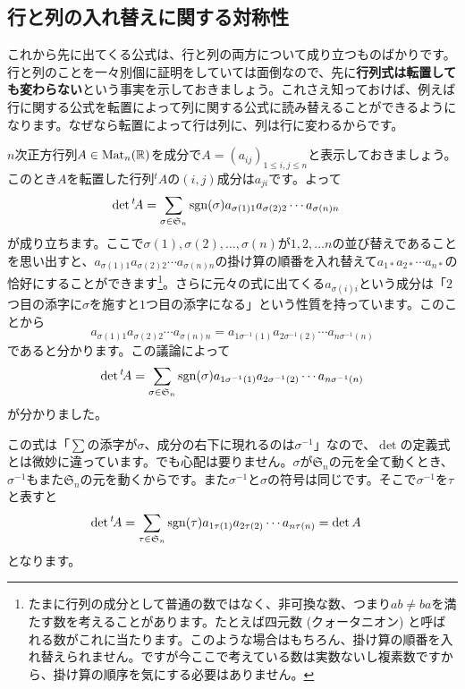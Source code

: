 \subsection{行と列の入れ替えに関する対称性}

これから先に出てくる公式は、行と列の両方について成り立つものばかりです。行と列のことを一々別個に証明をしていては面倒なので、先に\textbf{行列式は転置しても変わらない}という事実を示しておきましょう。これさえ知っておけば、例えば行に関する公式を転置によって列に関する公式に読み替えることができるようになります。なぜなら転置によって行は列に、列は行に変わるからです。

$n$次正方行列$A \in \operatorname{Mat}_n(\mathbb{R})$を成分で$A = (a_{ij})_{1 \leq i, j \leq n}$と表示しておきましょう。このとき$A$を転置した行列${}^t\!A$の$(i, j)$成分は$a_{ji}$です。よって
\begin{align*}
\det {}^t\!A
&= \sum_{\sigma \in \mathfrak{S}_n} \operatorname{sgn}(\sigma) a_{\sigma(1)1} a_{\sigma(2)2} \cdots a_{\sigma(n)n}
\end{align*}
が成り立ちます。ここで$\sigma(1), \sigma(2), \ldots, \sigma(n)$が$1, 2, \ldots n$の並び替えであることを思い出すと、$a_{\sigma(1)1} a_{\sigma(2)2} \cdots a_{\sigma(n)n}$の掛け算の順番を入れ替えて$a_{1*} a_{2*} \cdots a_{n*}$の恰好にすることができます\footnote{たまに行列の成分として普通の数ではなく、非可換な数、つまり$ab \neq ba$を満たす数を考えることがあります。たとえば四元数 (クォータニオン) と呼ばれる数がこれに当たります。このような場合はもちろん、掛け算の順番を入れ替えられません。ですが今ここで考えている数は実数ないし複素数ですから、掛け算の順序を気にする必要はありません。}。さらに元々の式に出てくる$a_{\sigma(i)i}$という成分は「$2$つ目の添字に$\sigma$を施すと$1$つ目の添字になる」という性質を持っています。このことから
\[
a_{\sigma(1)1} a_{\sigma(2)2} \cdots a_{\sigma(n)n} = a_{1\sigma^{-1}(1)} a_{2\sigma^{-1}(2)} \cdots a_{n\sigma^{-1}(n)}
\]
であると分かります。この議論によって
\begin{align*}
\det {}^t\!A
= \sum_{\sigma \in \mathfrak{S}_n} \operatorname{sgn}(\sigma) a_{1\sigma^{-1}(1)} a_{2\sigma^{-1}(2)} \cdots a_{n\sigma^{-1}(n)}
\end{align*}
が分かりました。

この式は「$\sum$の添字が$\sigma$、成分の右下に現れるのは$\sigma^{-1}$」なので、$\det$の定義式とは微妙に違っています。でも心配は要りません。$\sigma$が$\mathfrak{S}_n$の元を全て動くとき、$\sigma^{-1}$もまた$\mathfrak{S}_n$の元を動くからです。また$\sigma^{-1}$と$\sigma$の符号は同じです。そこで$\sigma^{-1}$を$\tau$と表すと
\begin{align*}
\det {}^t\!A
&= \sum_{\tau \in \mathfrak{S}_n} \operatorname{sgn}(\tau) a_{1\tau(1)} a_{2\tau(2)} \cdots a_{n\tau(n)} = \det A
\end{align*}
となります。

